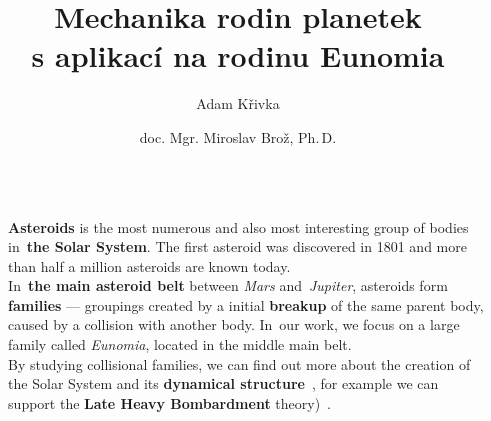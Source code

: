 \documentclass{beamer}
\title{Mechanika rodin planetek \\ s aplikací na rodinu Eunomia}
\author{Adam Křivka \\ \and doc. Mgr. Miroslav Brož, Ph.\,D.}
\institute{Cyrilometodějské gymnázium a střední odborná škola pedagogická Brno,\\ Lerchova 63, 602 00 Brno}
\newlength{\sep}
\newlength{\vyska}
\newlength{\vyskaA}
\newlength{\side}
\newlength{\main}
\newlength{\newparskip}
\begin{document}
\begin{frame}

\begin{columns}[t]

\begin{column}{\sep}
\end{column}
\begin{column}{\side}
	\begin{tcolorbox}[title=Asteroids in the Solar System\vphantom{Úy},height=0.335\vyskaA,parbox=false]
		\textbf{Asteroids} is the most numerous and also most interesting group of bodies in~\textbf{the Solar System}. The first asteroid was discovered in 1801 and more than half a million asteroids are known today.\\[\newparskip]

		In~\textbf{the main asteroid belt} between \textit{Mars} and~\textit{Jupiter}, asteroids form \textbf{families} --- groupings created by a initial \textbf{breakup} of the same parent body, caused by a collision with another body. In~our work, we focus on a large family called \textit{Eunomia}, located in the middle main belt.\\[\newparskip]

		By studying collisional families, we can find out more about the creation of the Solar System and its \textbf{dynamical structure}~\cite{nesvorny15}, for example we can support the \textbf{Late Heavy Bombardment} theory)~\cite{broz13}. \\[\newparskip]

		\vspace{3cm}


\end{tcolorbox}
\end{column}
\end{columns}
\end{frame}
\end{document}
